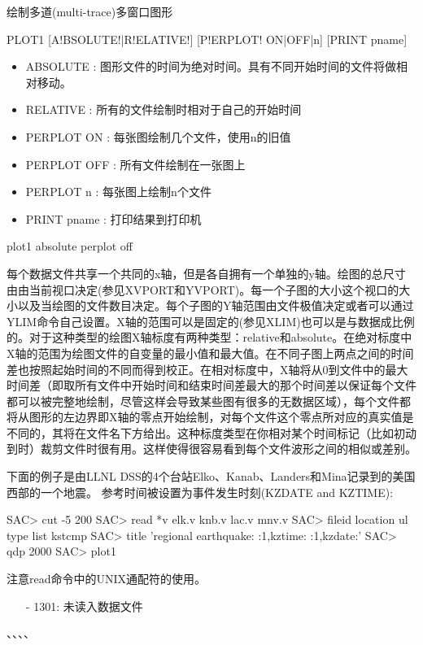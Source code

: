 \label{cmd:plot1}

绘制多道(multi-trace)多窗口图形

\begin{SACSTX}
PLOT1 [A!BSOLUTE!|R!ELATIVE!] [P!ERPLOT! ON|OFF|n] [PRINT pname]
\end{SACSTX}

\begin{itemize}
\item ABSOLUTE : 图形文件的时间为绝对时间。具有不同开始时间的文件将做相对移动。
\item RELATIVE : 所有的文件绘制时相对于自己的开始时间
\item PERPLOT ON : 每张图绘制几个文件，使用n的旧值 
\item PERPLOT OFF : 所有文件绘制在一张图上 
\item PERPLOT n : 每张图上绘制n个文件 
\item PRINT pname : 打印结果到打印机 
\end{itemize}

\begin{SACDFT}
plot1 absolute perplot off
\end{SACDFT}

每个数据文件共享一个共同的x轴，但是各自拥有一个单独的y轴。绘图的总尺寸由由当前视口决定(参见XVPORT和YVPORT)。每一个子图的大小这个视口的大小以及当绘图的文件数目决定。每个子图的Y轴范围由文件极值决定或者可以通过YLIM命令自己设置。X轴的范围可以是固定的(参见XLIM)也可以是与数据成比例的。对于这种类型的绘图X轴标度有两种类型：relative和absolute。在绝对标度中X轴的范围为绘图文件的自变量的最小值和最大值。在不同子图上两点之间的时间差也按照起始时间的不同而得到校正。在相对标度中，X轴将从0到文件中的最大时间差（即取所有文件中开始时间和结束时间差最大的那个时间差以保证每个文件都可以被完整地绘制，尽管这样会导致某些图有很多的无数据区域），每个文件都将从图形的左边界即X轴的零点开始绘制，对每个文件这个零点所对应的真实值是不同的，其将在文件名下方给出。这种标度类型在你相对某个时间标记（比如初动到时）裁剪文件时很有用。这样使得很容易看到每个文件波形之间的相似或差别。

下面的例子是由LLNL DSS的4个台站Elko、Kanab、Landers和Mina记录到的美国西部的一个地震。
参考时间被设置为事件发生时刻(KZDATE and KZTIME):
\begin{SACCode}
SAC> cut -5 200
SAC> read *v
 elk.v knb.v lac.v mnv.v
SAC> fileid location ul type list kstcmp
SAC> title 'regional earthquake:  :1,kztime:  :1,kzdate:'
SAC> qdp 2000
SAC> plot1
\end{SACCode}
注意read命令中的UNIX通配符的使用。

\begin{itemize}
\item[-]1301: 未读入数据文件
\end{itemize}

、、、、
